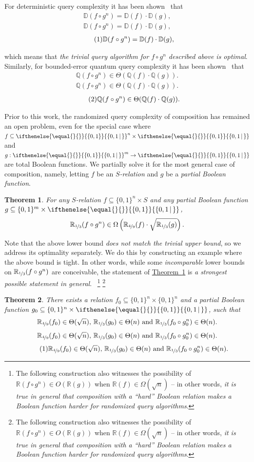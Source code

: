 \documentclass[11pt]{article}
\numberwithin{equation}{section}
\newtheorem{theorem}{Theorem}[section]
\theoremstyle{definition}
\theoremstyle{plain}
\newcommand{\R}{\mathbb R}
\newcommand{\Q}{\mathbb Q}
\newcommand{\expref}[2]{\hyperref[#2]{#1~\ref{#2}}}
\newcommand{\relation}{$S$-relation\xspace}     %
\newcommand{\md}{\middle}
\newcommand{\malabel}[1]{\addtocounter{equation}{1}\tag{\theequation}\label{#1}}
\newcommand{\m}[2][]{%
\ifthenelse{\equal{}{#1}}%
{\begin{align*} #2 \end{align*}}%
{\ifthenelse{\eq<ual{P}{#1}}%
{\begingroup\allowdisplaybreaks\begin{align*} #2%
\end{align*}\endgroup}%
{\begin{align*} \malabel{#1} #2 \end{align*}}%
}%
}
\newcommand{\dr}{\nicefrac}
\newcommand{\sq}{\sqrt}
\newcommand{\set}[2][]{\ifthenelse{\equal{}{#1}}%
{\ensuremath{\left\{#2\right\}}}%
{\ensuremath{\left\{#2\,\md|\,#1\right\}}}}
\newcommand{\asO}[1]{O(#1)}
\newcommand{\asOm}[1]{\Omega(#1)}
\newcommand{\asT}[1]{\Theta(#1)}
\newcommand{\OI}{\set{0,1}}
\newcommand{\txt}[1]{\textrm{#1}}  %
\newcommand{\fn}[2][]{%
\ifthenelse{\equal{}{#1}}%
{\footnote{#2}}%
{\footnote{\label{#1}#2}}%
}
\newcommand{\e}{\emph}
\newcommand{\D}{\mathbb{D}}
\begin{document}
For deterministic query complexity it has been shown~\cite{DBLP:journals/cjtcs/Montanaro14, Tal13} that
\m{
	\D(f \circ g^n) = \D(f) \cdot \D(g)
,}
which means that \e{the trivial query algorithm for $f \circ g^n$ described above is optimal}.
Similarly, for bounded-error quantum query complexity it has been shown~\cite{DBLP:conf/stoc/HoyerLS07,DBLP:conf/soda/Reichardt11a} that
\m{
	\Q(f \circ g^n) \in \Theta(\Q(f) \cdot \Q(g))
.}

Prior to this work, the randomized query complexity of composition has remained an open problem, even for the special case where $f \subseteq \OI^n \times \OI$ and $g:\OI^m \to \OI$  %
are   %
total Boolean %
functions.  %
We partially solve it for the most general case of
composition, namely,  %
%
letting $f$ be %
an \e{$S$-relation}  %
and $g$ be a \e{partial Boolean function}.


\begin{theorem}
\label{main_theo}
For any %
\relation  %
$f \subseteq \{0,1\}^n \times S$ and any partial Boolean function
%
$g\subseteq \{0,1\}^m \times \OI$,
\[\R_{\dr13}(f \circ g^n) \in \Omega\left(\R_{\dr49}(f) \cdot \sqrt{\R_{\dr13}(g)}\right).\]
\end{theorem}


Note that the above lower bound \e{does not match the trivial upper bound}, 
%
%
so we address its optimality separately.  %
%
We do this by  %
constructing an example where the above bound is 
%
tight. In  %
other words, while some \e{incomparable} lower bounds on $\R_{\dr13}(f \circ g^n)$ are conceivable, the statement of \expref{Theorem}{main_theo} is \e{a strongest possible statement in general}.~\fn
{The following construction also witnesses the possibility of $\R(f\circ g^n) \in \asO{\R(g)}$ when $\R(f) \in \asOm{\sq n}$ -- in other words, \e{it is
%
true in general  %
that composition with a ``hard''  %
Boolean  %
relation makes a Boolean function harder for randomized query algorithms}.}


\begin{theorem}
\label{t_match}
There exists a    %
%
%
relation $f_0 \subseteq \{0,1\}^n \times \{0,1\}^n$ and a partial Boolean function
%
$g_0\subseteq \{0,1\}^n \times \OI$, such that
\m{
  \R_{\dr49}(f_0)\in\asT{\sq n},\,
  \R_{\dr13}(g_0)\in\asT{n}
  \txt{~and~}
  \R_{\dr13}(f_0\circ g_0^n)\in\asT{n}.}
\end{theorem}
\end{document}
